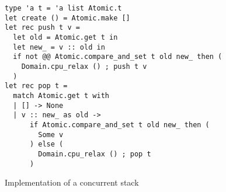 \begin{figure}[tp]
\begin{verbatim}
type 'a t = 'a list Atomic.t
let create () = Atomic.make []
let rec push t v =
  let old = Atomic.get t in
  let new_ = v :: old in
  if not @@ Atomic.compare_and_set t old new_ then (
    Domain.cpu_relax () ; push t v
  )
let rec pop t =
  match Atomic.get t with
  | [] -> None
  | v :: new_ as old ->
      if Atomic.compare_and_set t old new_ then (
        Some v
      ) else (
        Domain.cpu_relax () ; pop t
      )
\end{verbatim}
\caption{Implementation of a concurrent stack}
\label{fig:stack}
\end{figure}